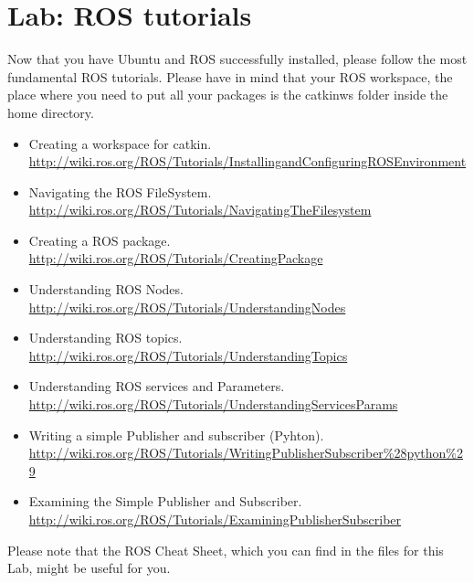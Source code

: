 \documentclass[a4paper,10pt]{article}
\begin{document}
\section{Lab: ROS tutorials}
Now that you have Ubuntu and ROS successfully installed, please follow the most fundamental ROS tutorials. Please have in mind that your ROS workspace, the place where you need to put all your packages is the catkin{\textunderscore}ws folder inside the home directory.

\begin{itemize}
    \item Creating a workspace for catkin.\\
    \url{http://wiki.ros.org/ROS/Tutorials/InstallingandConfiguringROSEnvironment}

    \item Navigating the ROS FileSystem.\\
    \url{http://wiki.ros.org/ROS/Tutorials/NavigatingTheFilesystem}

    \item Creating a ROS package.\\
    \url{http://wiki.ros.org/ROS/Tutorials/CreatingPackage}

    \item Understanding ROS Nodes.\\
    \url{http://wiki.ros.org/ROS/Tutorials/UnderstandingNodes}

    \item Understanding ROS topics.\\
    \url{http://wiki.ros.org/ROS/Tutorials/UnderstandingTopics}

    \item Understanding ROS services and Parameters.\\
    \url{http://wiki.ros.org/ROS/Tutorials/UnderstandingServicesParams}

    \item Writing a simple Publisher and subscriber (Pyhton).\\
    \url{http://wiki.ros.org/ROS/Tutorials/WritingPublisherSubscriber%28python%29}

    \item Examining the Simple Publisher and Subscriber.\\
    \url{http://wiki.ros.org/ROS/Tutorials/ExaminingPublisherSubscriber}
\end{itemize}
\noindent
Please note that the ROS Cheat Sheet, which you can find in the files for this Lab, might be useful for you.
\end{document}

